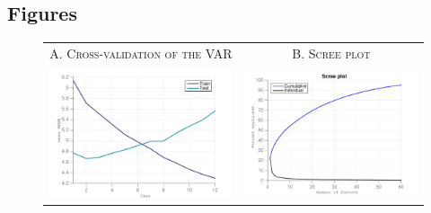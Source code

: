 \documentclass[11pt,a4paper]{article}
\begin{document}
\subsection*{Figures}

	\begin{figure}[H]
		\begin{center}
		\caption{}
			\label{fig:CV}
			\begin{tabular}{cc}
				A. \textsc{Cross-validation of the VAR} & B. \textsc{Scree plot}  \\
				\includegraphics[width=8cm]{Figures/CVlags} &  \includegraphics[width=8cm]{Figures/screeplot}
			\end{tabular}
		\end{center}
\end{figure}
		
	
\end{document}
